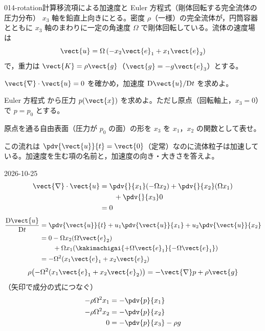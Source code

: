\documentclass[uplatex,dvipdfmx,a4paper,11pt]{jsarticle}
\begin{document}
\begin{mondai}{014-rotation}{計算}{移流項による加速度と Euler 方程式（剛体回転する完全流体の圧力分布）}
$x_3$ 軸を鉛直上向きにとる。密度 $\rho$（一様）の完全流体が，円筒容器とともに $x_3$ 軸のまわりに一定の角速度 $\Omega$ で剛体回転している。流体の速度場は
\[ \vect{u}=\Omega\,(-x_2\vect{e}_1+x_1\vect{e}_2) \]
で，重力は $\vect{K}=\rho\vect{g}$（$\vect{g}=-g\vect{e}_3$）とする。
\begin{shoumon}
  \item $\vect{\nabla}\cdot\vect{u}=0$ を確かめ，加速度 $\mathrm{D}\vect{u}/\mathrm{D}t$ を求めよ。
  \item Euler 方程式  から圧力 $p(\vect{x})$ を求めよ。ただし原点（回転軸上，$x_3=0$）で $p=p_0$ とする。
  \item 原点を通る自由表面（圧力が $p_0$ の面）の形を $x_3$ を $x_1$，$x_2$ の関数として表せ。
  \item この流れは $\pdv{\vect{u}}{t}=\vect{0}$（定常）なのに流体粒子は加速している。加速度を生む項の名前と，加速度の向き・大きさを答えよ。
\end{shoumon}
\begin{kotaeutsushi}{2026-10-25}
\begin{align*}
\vect{\nabla}\cdot\vect{u}&=\pdv{}{x_{1}}(-\Omega x_{2})+\pdv{}{x_{2}}(\Omega x_{1})\\
&\qquad+\pdv{}{x_{3}}0\\
&=0
\end{align*}
\begin{align*}
\frac{\mathrm{D}\vect{u}}{\mathrm{D}t}&=\pdv{\vect{u}}{t}+u_{1}\pdv{\vect{u}}{x_{1}}+u_{2}\pdv{\vect{u}}{x_{2}}\\
&=0-\Omega x_{2}(\Omega\vect{e}_{2})\\
&\qquad+\Omega x_{1}(\kakimachigai{+\Omega\vect{e}_{1}}{-\Omega\vect{e}_{1}})\\
&=-\Omega^{2}(x_{1}\vect{e}_{1}+x_{2}\vect{e}_{2})
\end{align*}
\[ \rho\bigl(-\Omega^{2}(x_{1}\vect{e}_{1}+x_{2}\vect{e}_{2})\bigr)=-\vect{\nabla}p+\rho\vect{g} \]
（矢印で成分の式につなぐ）
\begin{align*}
-\rho\Omega^{2}x_{1}&=-\pdv{p}{x_{1}}\\
-\rho\Omega^{2}x_{2}&=-\pdv{p}{x_{2}}\\
0&=-\pdv{p}{x_{3}}-\rho g
\end{align*}
\begin{align*}

\end{align*}
\end{kotaeutsushi}
\end{mondai}
\end{document}
